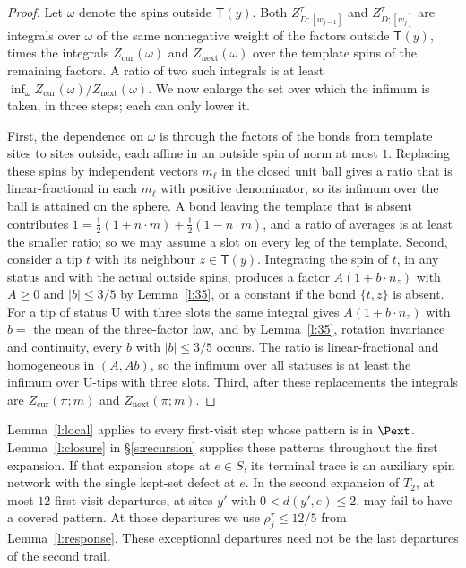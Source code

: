 \begin{proof}
Let $\omega$ denote the spins outside $\mathsf T(y)$. Both $Z^\tau_{D;[w_{j - 1}]}$ and $Z^\tau_{D;[w_j]}$ are integrals over $\omega$ of the same nonnegative weight of the factors outside $\mathsf T(y)$, times the integrals $Z_{\mathrm{cur}}(\omega)$ and $Z_{\mathrm{next}}(\omega)$ over the template spins of the remaining factors. A ratio of two such integrals is at least $\inf_\omega Z_{\mathrm{cur}}(\omega)/Z_{\mathrm{next}}(\omega)$. We now enlarge the set over which the infimum is taken, in three steps; each can only lower it.

First, the dependence on $\omega$ is through the factors of the bonds from template sites to sites outside, each affine in an outside spin of norm at most $1$. Replacing these spins by independent vectors $m_\ell$ in the closed unit ball gives a ratio that is linear-fractional in each $m_\ell$ with positive denominator, so its infimum over the ball is attained on the sphere. A bond leaving the template that is absent contributes $1 = \frac12 (1 + n \cdot m) + \frac12 (1 - n \cdot m)$, and a ratio of averages is at least the smaller ratio; so we may assume a slot on every leg of the template. Second, consider a tip $t$ with its neighbour $z \in \mathsf T(y)$. Integrating the spin of $t$, in any status and with the actual outside spins, produces a factor $A (1 + b \cdot n_z)$ with $A \ge 0$ and $|b| \le 3/5$ by Lemma~\ref{l:35}, or a constant if the bond $\{t, z\}$ is absent. For a tip of status $\mathrm U$ with three slots the same integral gives $A(1 + b \cdot n_z)$ with $b = $ the mean of the three-factor law, and by Lemma~\ref{l:35}, rotation invariance and continuity, every $b$ with $|b| \le 3/5$ occurs. The ratio is linear-fractional and homogeneous in $(A, A b)$, so the infimum over all statuses is at least the infimum over $\mathrm U$-tips with three slots. Third, after these replacements the integrals are $Z_{\mathrm{cur}}(\pi; m)$ and $Z_{\mathrm{next}}(\pi; m)$.
\end{proof}

\begin{remark}
Lemma~\ref{l:local} applies to every first-visit step whose pattern is
in $\Pext$. Lemma~\ref{l:closure} in \S\ref{s:recursion} supplies
these patterns throughout the first expansion. If that expansion
stops at $e\in S$, its terminal trace is an auxiliary spin network
with the single kept-set defect at $e$. In the second expansion of
$T_2$, at most $12$ first-visit departures, at sites $y'$ with
$0<d(y',e)\le2$, may fail to have a covered pattern. At those
departures we use $\rho^\tau_j\le12/5$ from
Lemma~\ref{l:response}. These exceptional departures need not be
the last departures of the second trail.
\end{remark}

